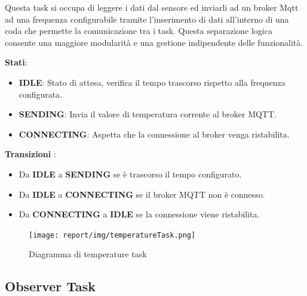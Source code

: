 \documentclass{report}
\begin{document}
\par{
    Questa task si occupa di leggere i dati dal sensore ed inviarli ad un broker Mqtt ad una frequenza configurabile tramite l'inserimento di dati all'interno di una coda che permette la comunicazione tra i task. Questa separazione logica consente una maggiore modularità e una gestione indipendente delle funzionalità.\newline
}
\par{\textbf{Stati}:}
\begin{itemize}
    \item \textbf{IDLE}: Stato di attesa, verifica il tempo trascorso rispetto alla frequenza configurata.
    \item \textbf{SENDING}: Invia il valore di temperatura corrente al broker MQTT.
    \item \textbf{CONNECTING}: Aspetta che la connessione al broker venga ristabilita.
\end{itemize}
\par{
    \textbf{Transizioni} :
}
\begin{itemize}
    \item Da \textbf{IDLE} a \textbf{SENDING} se è trascorso il tempo configurato.
    \item Da \textbf{IDLE} a \textbf{CONNECTING} se il broker MQTT non è connesso.
    \item Da \textbf{CONNECTING} a \textbf{IDLE} se la connessione viene ristabilita.
\end{itemize}


\begin{figure}[!h]
    \centering
    \texttt{[image: report/img/temperatureTask.png]}
    \caption{Diagramma di temperature task}
    \label{fig:stati}
\end{figure}

\subsection{Observer Task}
\end{document}
